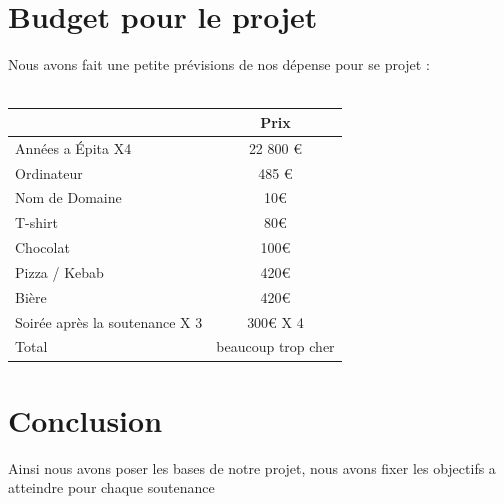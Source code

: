 \documentclass [11pt]{report}
\begin{document}
\chapter {Budget pour le projet}
	Nous avons fait une petite prévisions de nos dépense pour se projet :\\\\
				\begin{tabular}{|l|c|}
				\hline
		 		 & Prix \\
				\hline
				Années a \'Epita X4 & 22 800 € \\
				\hline
				Ordinateur & 485 €  \\
				\hline
				Nom de Domaine &  10€ \\
				\hline
				T-shirt & 80€ \\
				\hline
				Chocolat & 100€ \\
				\hline
				Pizza / Kebab & 420€  \\
				\hline
				Bière  & 420€   \\
	          			 \hline
				Soirée après la soutenance X 3  & 300€ X 4\\
				\hline 
				Total & beaucoup trop cher \\
				\hline
				
			\end{tabular}
\chapter {Conclusion}
	Ainsi nous avons poser les bases de notre projet, nous avons fixer les objectifs a atteindre pour chaque soutenance
\end{document}
